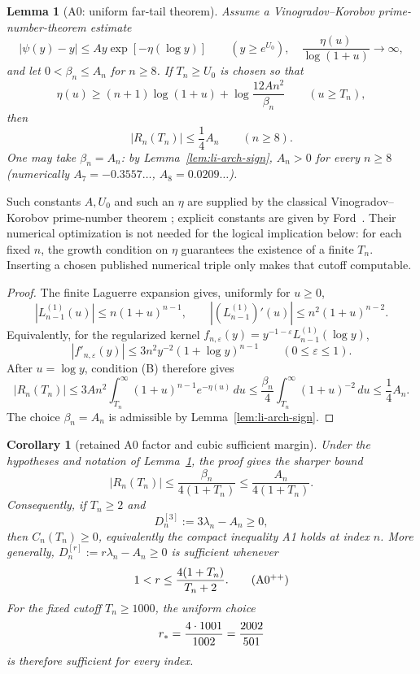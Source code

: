 \documentclass[11pt]{amsart}
\newtheorem{lemma}[theorem]{Lemma}
\newtheorem{corollary}[theorem]{Corollary}
\theoremstyle{definition}
\theoremstyle{remark}
\theoremstyle{definition}
\begin{document}
\begin{lemma}[A0: uniform far-tail theorem]\label{thm:a0-tail-direct}
Assume a Vinogradov--Korobov prime-number-theorem estimate
\[
 |\psi(y)-y|\le Ay\exp[-\eta(\log y)]\qquad(y\ge e^{U_0}),
 \quad \frac{\eta(u)}{\log(1+u)}\longrightarrow\infty,
\]
and let $0<\beta_n\le A_n$ for $n\ge8$.  If $T_n\ge U_0$ is chosen so that
\[
 \eta(u)\ge(n+1)\log(1+u)+\log\frac{12An^2}{\beta_n}
 \qquad(u\ge T_n),                                      \tag{B}
\]
then
\[
 \boxed{\quad |R_n(T_n)|\le\frac14A_n\qquad(n\ge8).\quad} \tag{A0}
\]
One may take $\beta_n=A_n$: by Lemma~\ref{lem:li-arch-sign}, $A_n>0$ for every $n\ge8$
(numerically $A_7=-0.3557\ldots$, $A_8=0.0209\ldots$).
\end{lemma}

Such constants $A,U_0$ and such an $\eta$ are supplied by the classical
Vinogradov--Korobov prime-number theorem \cite{Vinogradov1958,Korobov}; explicit constants are
given by Ford~\cite{Ford2002}.  Their numerical optimization is not
needed for the logical implication below: for each fixed $n$, the growth condition on $\eta$ guarantees
the existence of a finite $T_n$.  Inserting a chosen published numerical triple only makes that cutoff
computable.

\begin{proof}
The finite Laguerre expansion gives, uniformly for $u\ge0$,
\[
 |L_{n-1}^{(1)}(u)|\le n(1+u)^{n-1},\qquad
 |(L_{n-1}^{(1)})'(u)|\le n^2(1+u)^{n-2}.
\]
Equivalently, for the regularized kernel
$f_{n,\varepsilon}(y)=y^{-1-\varepsilon}L_{n-1}^{(1)}(\log y)$,
\[
 |f'_{n,\varepsilon}(y)|\le3n^2y^{-2}(1+\log y)^{n-1}
 \qquad(0\le\varepsilon\le1).
\]
After $u=\log y$, condition (B) therefore gives
\[
 |R_n(T_n)|
 \le3An^2\int_{T_n}^\infty(1+u)^{n-1}e^{-\eta(u)}\,du
 \le\frac{\beta_n}{4}\int_{T_n}^\infty(1+u)^{-2}\,du
 \le\frac14A_n.
\]
The choice $\beta_n=A_n$ is admissible by Lemma~\ref{lem:li-arch-sign}.
\end{proof}

\begin{corollary}[retained A0 factor and cubic sufficient margin]
\label{cor:a0-retained-cubic-margin}
Under the hypotheses and notation of Lemma~\ref{thm:a0-tail-direct}, the
proof gives the sharper bound
\[
 \boxed{\quad
 |R_n(T_n)|\le \frac{\beta_n}{4(1+T_n)}
              \le \frac{A_n}{4(1+T_n)}.\quad}       \tag{A0$^+$}
\]
Consequently, if $T_n\ge2$ and
\[
 D_n^{[3]}:=3\lambda_n-A_n\ge0,
\]
then $C_n(T_n)\ge0$, equivalently the compact inequality A1 holds
at index $n$.  More generally, $D_n^{[r]}:=r\lambda_n-A_n\ge0$ is
sufficient whenever
\[
 1<r\le {4(1+T_n)\over T_n+2}.                    \tag{A0$^{++}$}
\]
For the fixed cutoff $T_n\ge1000$, the uniform choice
\[
 r_*={4\cdot1001\over1002}={2002\over501}
\]
is therefore sufficient for every index.
\end{corollary}
\end{document}
